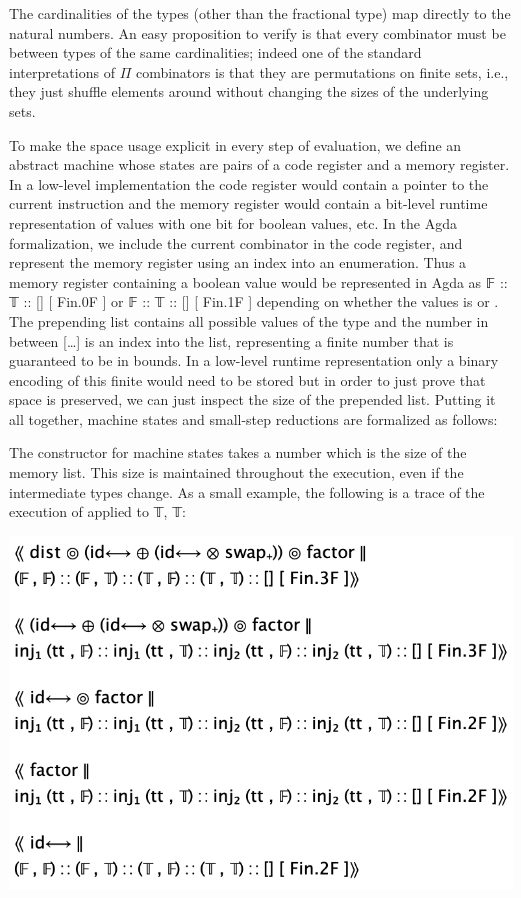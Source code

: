 \documentclass[sigplan,10pt,review,anonymous]{acmart}
\begin{document}
\PIFMEMsize{}  %

\vspace{-\baselineskip}

\PIMEMcardeq{}

The cardinalities of the types (other than the fractional type) map
directly to the natural numbers. An easy proposition to verify is that
every combinator must be between types of the same cardinalities;
indeed one of the standard interpretations of $\Pi$ combinators is
that they are permutations on finite sets, i.e., they just shuffle
elements around without changing the sizes of the underlying sets.

To make the space usage explicit in every step of evaluation, we
define an abstract machine whose states are pairs of a code register
and a memory register. In a low-level implementation the code register
would contain a pointer to the current instruction and the memory
register would contain a bit-level runtime representation of values
with one bit for boolean values, etc. In the Agda formalization, we
include the current combinator in the code register, and represent the
memory register using an index into an enumeration. Thus a memory
register containing a boolean value would be represented in Agda as 𝔽
::  𝕋 :: [] [ Fin.0F ] or 𝔽 :: 𝕋 :: [] [ Fin.1F ] depending on whether
the values is  or . The prepending list
contains all possible values of the type and the number in between [\ldots ] 
is an index into the list, representing a finite number that
is guaranteed to be in bounds. In a low-level runtime representation
only a binary encoding of this finite would need to be stored but in
order to just prove that space is preserved, we can just inspect the
size of the prepended list. Putting it all together, machine states and
small-step reductions are formalized as follows:

\PIMEMstep{}

The constructor for machine states takes a number which is the size of
the memory list. This size is maintained throughout the execution,
even if the intermediate types change. As a small example, the
following is a trace of the execution of  applied
to 𝕋, 𝕋:

\includegraphics[scale=0.4]{trace1.png}
\end{document}
